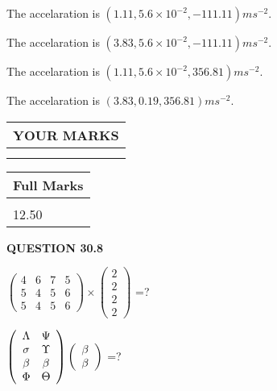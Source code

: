 \documentclass[12pt]{article}
\begin{document}
  
 
 
  The accelaration is $  %
(
1.11,
5.6 \times 10^{-2},
-111.11)
ms^{-2} $.
 
 
  The accelaration is $  %
(
3.83,
5.6 \times 10^{-2},
-111.11)
ms^{-2} $.
 
 
  The accelaration is $  %
(
1.11,
5.6 \times 10^{-2},
356.81)
ms^{-2} $.
 
 
  The accelaration is $  %
(
3.83,
0.19,
356.81)
ms^{-2} $.
 
 
 

 
 
\vspace{0.3in}
  
\vspace{0.2in}
  
\noindent\begin{tabular}{|l|}
\hline
 YOUR MARKS  \\
\hline
 \\ 
 \\ 
\hline
\end{tabular}
\hspace{0.05in} \begin{tabular}{|l|}
\hline
 Full Marks  \\
\hline
 \\ 
12.50 \\
\hline
\end{tabular}
{\textbf{\Large{QUESTION
30.8 
}}}
  
  
 
$ \left( \begin{array}{ccccccccc}
           4  & 
           6  & 
           7  & 
           5  \\ 
           5  & 
           4  & 
           5  & 
           6  \\ 
           5  & 
           4  & 
           5  & 
           6
\end{array}\right) \times
\left( \begin{array}{c}
           2  \\ 
           2  \\ 
           2  \\ 
           2
\end{array}\right) $ =?
 
 
$  %
 \left( \begin{array}
 {
 c
 c
 }
 \Lambda & 
 \Psi \\ 
 \sigma & 
 \Upsilon \\ 
 \beta & 
 \beta \\ 
 \Phi & 
 \Theta
 \end{array} \right)
 \left( \begin{array}
 {
 c
 }
 \beta \\ 
 \beta
 \end{array} \right)
$ =?
 
\end{document}
